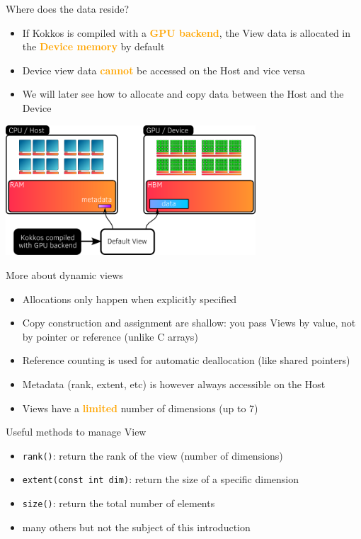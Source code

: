 \documentclass[aspectratio=169]{beamer}
\newcommand{\highlight}[1]{\textcolor{orange}{\textbf{#1}}}
\begin{document}
\begin{frame}{Where does the data reside?}
    \begin{itemize}
        \item If Kokkos is compiled with a \highlight{GPU backend}, the View data is allocated in the \highlight{Device memory} by default
        \item Device view data \highlight{cannot} be accessed on the Host and vice versa
        \item We will later see how to allocate and copy data between the Host and the Device
    \end{itemize}
    \begin{center}
        \includegraphics[width=0.7\textwidth]{device_view_memory.png}
    \end{center}
\end{frame}


\begin{frame}{More about dynamic views}
    \begin{itemize}
        \item Allocations only happen when explicitly specified
        \item Copy construction and assignment are shallow: you pass Views by value, not by pointer or reference (unlike C arrays)
        \item Reference counting is used for automatic deallocation (like shared pointers)
        \item Metadata (rank, extent, etc) is however always accessible on the Host
        \item Views have a \highlight{limited} number of dimensions (up to 7)
    \end{itemize}
\end{frame}


\begin{frame}{Useful methods to manage View}
    \begin{itemize}
        \item \texttt{rank()}: return the rank of the view (number of dimensions)
        \item \texttt{extent(const int dim)}: return the size of a specific dimension
        \item \texttt{size()}: return the total number of elements
        \item many others but not the subject of this introduction
    \end{itemize}
\end{frame}
\end{document}
